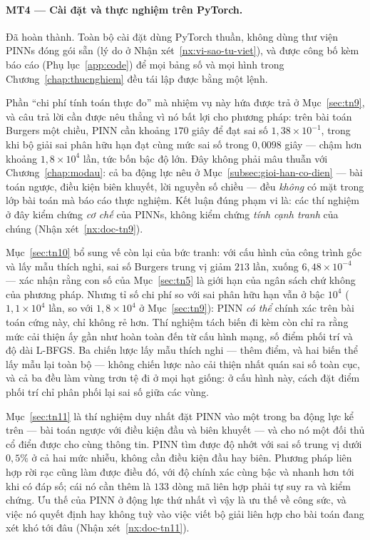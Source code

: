\paragraph{MT4 --- Cài đặt và thực nghiệm trên PyTorch.}
Đã hoàn thành. Toàn bộ cài đặt dùng PyTorch thuần, không dùng thư viện PINNs đóng
gói sẵn (lý do ở Nhận xét~\ref{nx:vi-sao-tu-viet}), và được công bố kèm báo cáo
(Phụ lục~\ref{app:code}) để mọi bảng số và mọi hình trong
Chương~\ref{chap:thucnghiem} đều tái lập được bằng một lệnh.

Phần ``chi phí tính toán thực đo'' mà nhiệm vụ này hứa được trả ở
Mục~\ref{sec:tn9}, và câu trả lời cần được nêu thẳng vì nó bất lợi cho phương
pháp: trên bài toán Burgers một chiều, PINN cần khoảng $170$ giây để đạt sai số
$1{,}38\times10^{-1}$, trong khi bộ giải sai phân hữu hạn đạt cùng mức sai số
trong $0{,}0098$ giây --- chậm hơn khoảng $1{,}8\times10^{4}$ lần, tức bốn bậc độ
lớn. Đây không phải mâu thuẫn với Chương~\ref{chap:modau}: cả ba động lực
nêu ở Mục~\ref{subsec:gioi-han-co-dien} --- bài toán ngược, điều kiện biên
khuyết, lời nguyền số chiều --- đều \emph{không} có mặt trong lớp bài toán mà
báo cáo thực nghiệm. Kết luận đúng phạm vi là: các thí nghiệm ở đây kiểm chứng
\emph{cơ chế} của PINNs, không kiểm chứng \emph{tính cạnh tranh} của chúng
(Nhận xét~\ref{nx:doc-tn9}).

Mục~\ref{sec:tn10} bổ sung vế còn lại của bức tranh: với cấu hình của công trình
gốc và lấy mẫu thích nghi, sai số Burgers trung vị giảm $213$ lần, xuống
$6{,}48\times10^{-4}$ --- xác nhận rằng con số của Mục~\ref{sec:tn5} là giới hạn
của ngân sách chứ không của phương pháp. Nhưng tỉ số chi phí so với sai phân hữu
hạn vẫn ở bậc $10^{4}$ ($1{,}1\times10^{4}$ lần, so với $1{,}8\times10^{4}$ ở
Mục~\ref{sec:tn9}): PINN \emph{có thể} chính xác trên bài toán cứng này, chỉ
không rẻ hơn. Thí nghiệm tách biến đi kèm còn chỉ ra rằng mức cải thiện ấy gần
như hoàn toàn đến từ cấu hình mạng, số điểm phối trí và độ dài L-BFGS. Ba chiến
lược lấy mẫu thích nghi --- thêm điểm, và hai biến thể lấy mẫu lại toàn bộ ---
không chiến lược nào cải thiện nhất quán sai số toàn cục, và cả ba đều làm vùng
trơn tệ đi ở mọi hạt giống: ở cấu hình này, cách đặt điểm phối trí chỉ phân phối
lại sai số giữa các vùng.

Mục~\ref{sec:tn11} là thí nghiệm duy nhất đặt PINN vào một trong ba động lực kể
trên --- bài toán ngược với điều kiện đầu và biên khuyết --- và cho nó một đối thủ
cổ điển được cho cùng thông tin. PINN tìm được độ nhớt với sai số trung vị dưới
$0{,}5\%$ ở cả hai mức nhiễu, không cần điều kiện đầu hay biên. Phương pháp liên
hợp rời rạc cũng làm được điều đó, với độ chính xác cùng bậc và nhanh hơn tới khi
có đáp số; cái nó cần thêm là $133$ dòng mã liên hợp phải tự suy ra và kiểm
chứng. Ưu thế của PINN ở động lực thứ nhất vì vậy là ưu thế về công sức, và việc
nó quyết định hay không tuỳ vào việc viết bộ giải liên hợp cho bài toán đang xét
khó tới đâu (Nhận xét~\ref{nx:doc-tn11}).

